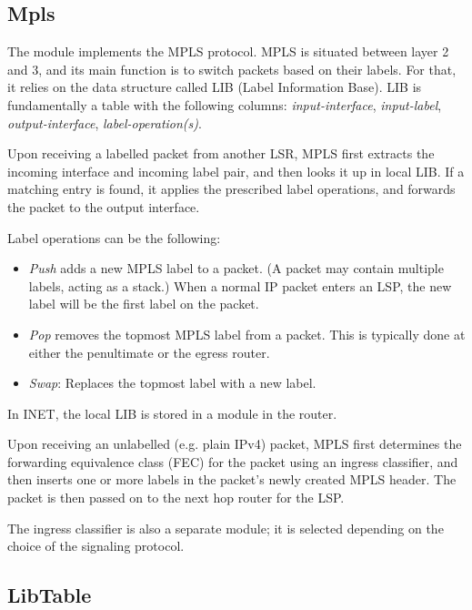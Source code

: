 \subsection{Mpls}

The  module implements the MPLS protocol. MPLS is situated between
layer 2 and 3, and its main function is to switch packets based on their labels.
For that, it relies on the data structure called LIB (Label Information Base).
LIB is fundamentally a table with the following columns: \textit{input-interface},
\textit{input-label}, \textit{output-interface}, \textit{label-operation(s)}.

Upon receiving a labelled packet from another LSR, MPLS first extracts the
incoming interface and incoming label pair, and then looks it up in local LIB. 
If a matching entry is found, it applies the prescribed label operations, and 
forwards the packet to the output interface. 

Label operations can be the following:

\begin{itemize}
  \item \textit{Push} adds a new MPLS label to a packet. (A packet may 
     contain multiple labels, acting as a stack.) When a normal IP packet
     enters an LSP, the new label will be the first label on the packet.
  \item \textit{Pop} removes the topmost MPLS label from a packet. 
     This is typically done at either the penultimate or the egress router.
  \item \textit{Swap}: Replaces the topmost label with a new label.
\end{itemize}

In INET, the local LIB is stored in a  module in the router.

Upon receiving an unlabelled (e.g. plain IPv4) packet, MPLS first determines the
forwarding equivalence class (FEC) for the packet using an ingress classifier, 
and then inserts one or more labels in the packet's newly created MPLS header. 
The packet is then passed on to the next hop router for the LSP.

The ingress classifier is also a separate module; it is selected depending 
on the choice of the signaling protocol.


\subsection{LibTable}

